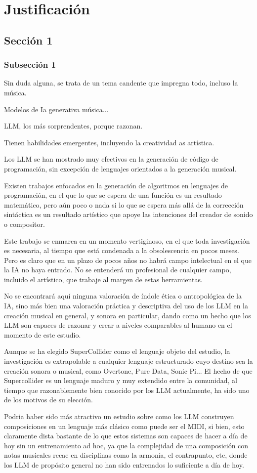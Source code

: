 \chapter{Justificación}
\section{Sección 1}
\subsection{Subsección 1}

Sin duda alguna, se trata de un tema candente que impregna todo, incluso la música.

Modelos de Ia generativa música...

LLM, los más sorprendentes, porque razonan.

Tienen habilidades emergentes, incluyendo la creatividad as artística.

Los LLM se han mostrado muy efectivos en la generación de código de programación, sin excepción de lenguajes orientados a la generación musical. 

Existen trabajos enfocados en la generación de algoritmos en lenguajes de programación, en el que lo que se espera de una función es un resultado matemático, pero aún poco o nada si lo que se espera más allá de la corrección sintáctica es un resultado artístico que apoye las intenciones del creador de sonido o compositor.

Este trabajo se enmarca en un momento vertiginoso, en el que toda investigación es necesaria, al tiempo que está condenada a la obsolescencia en pocos meses. Pero es claro que en un plazo de pocos años no habrá campo intelectual en el que la IA no haya entrado. No se entenderá un profesional de cualquier campo, incluido el artístico, que trabaje al margen de estas herramientas.

No se encontrará aquí ninguna valoración de índole ética o antropológica de la IA, sino más bien una valoración práctica y descriptiva del uso de los LLM en la creación musical en general, y sonora en particular, dando como un hecho que los LLM son capaces de razonar y crear a niveles comparables al humano en el momento de este estudio.

Aunque se ha elegido SuperCollider como el lenguaje objeto del estudio, la investigación es extrapolable a cualquier lenguaje estructurado cuyo destino sea la creación sonora o musical, como Overtone, Pure Data, Sonic Pi... El hecho de que Supercollider es un lenguaje maduro y muy extendido entre la comunidad, al tiempo que razonablemente bien conocido por los LLM actualmente, ha sido uno de los motivos de su elección.

Podria haber sido más atractivo un estudio sobre como los LLM construyen composiciones en un lenguaje más clásico como puede ser el MIDI, si bien, esto claramente dista bastante de lo que estos sistemas son capaces de hacer a día de hoy sin un entrenamiento ad hoc, ya que la complejidad de una composición con notas musicales recae en disciplinas como la armonía, el contrapunto, etc, donde los LLM de propósito general no han sido entrenados lo suficiente a día de hoy.
